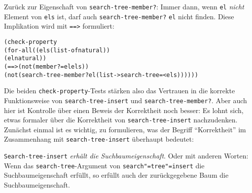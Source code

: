 %
Zurück zur Eigenschaft von \texttt{search-tree-member?}: Immer dann,
wenn \texttt{el} \emph{nicht} Element von \texttt{els} ist, darf auch
\texttt{search-tree-member?} \texttt{el} nicht finden.  Diese
Implikation wird mit \texttt{==>} formuliert:
%
\begin{alltt}
(check-property
 (for-all ((els (list-of natural))
           (el natural))
   (==> (not (member? = el els))
        (not (search-tree-member? el (list->search-tree = < els)))))) 
\end{alltt}
%
Die beiden \texttt{check-property}-Tests stärken also das Vertrauen in
die korrekte Funktionsweise von \texttt{search-tree-insert} und
\texttt{search-tree-member?}.  Aber auch hier ist Kontrolle über einen
Beweis der Korrektheit noch besser:
Es lohnt sich, etwas formaler über die
Korrektheit von \texttt{search-tree-insert} nachzudenken.  Zunächst
einmal ist es wichtig, zu formulieren, was der Begriff "`Korrektheit"'
im Zusammenhang mit \texttt{search-tree-insert} überhaupt bedeutet:
%
\begin{satz}\label{satz:suchbaum}
  \texttt{Search-tree-insert} \emph{erhält die Suchbaumeigenschaft}.
  Oder mit anderen Worten: Wenn das \texttt{search-tree}-Argument von
  \texttt{search"=tree"=insert} die Suchbaumeigenschaft erfüllt, so
  erfüllt auch der zurückgegebene Baum die Suchbaumeigenschaft.
\end{satz}
%
